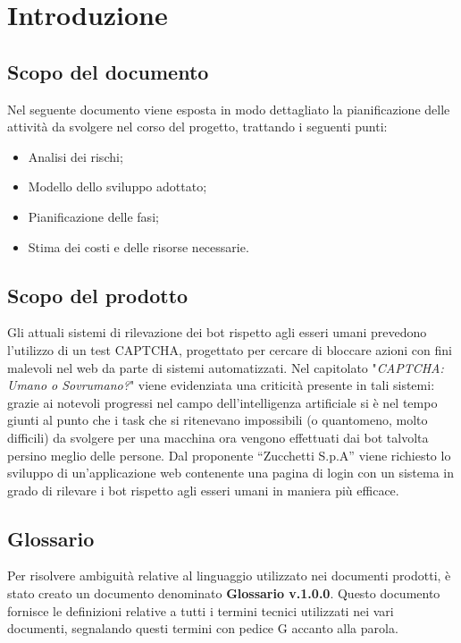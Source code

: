 \section{Introduzione}

\subsection{Scopo del documento}
Nel seguente documento viene esposta in modo dettagliato la pianificazione delle attività da svolgere nel corso del progetto, trattando i seguenti punti:
\begin{itemize}
	\item Analisi dei rischi;
	\item Modello dello sviluppo adottato;
	\item Pianificazione delle fasi;
	\item Stima dei costi e delle risorse necessarie.
\end{itemize}

\subsection{Scopo del prodotto}
Gli attuali sistemi di rilevazione dei bot rispetto agli esseri umani prevedono l'utilizzo di un test CAPTCHA, progettato per cercare di bloccare azioni con fini malevoli nel web da parte di sistemi automatizzati. Nel capitolato "\textit{CAPTCHA: Umano o Sovrumano?}" viene evidenziata una criticità presente in tali sistemi: grazie ai notevoli progressi nel campo dell’intelligenza artificiale si è nel tempo giunti al punto che i task che si ritenevano impossibili (o quantomeno, molto difficili) da svolgere per una macchina ora vengono effettuati dai bot talvolta persino meglio delle persone.
Dal proponente “Zucchetti S.p.A” viene richiesto lo sviluppo di un'applicazione web contenente una pagina di login con un sistema in grado di rilevare i bot rispetto agli esseri umani in maniera più efficace.

\subsection{Glossario}
Per risolvere ambiguità relative al linguaggio utilizzato nei documenti prodotti, è stato creato un documento denominato \textbf{Glossario v.1.0.0}. Questo documento fornisce le definizioni relative a tutti i termini tecnici utilizzati nei vari documenti, segnalando questi termini con pedice G accanto alla parola.

